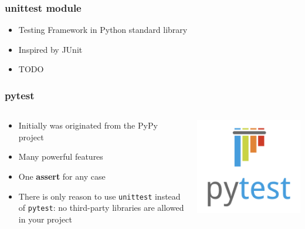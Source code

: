 \documentclass[compress]{beamer}
\begin{document}
\begin{frame}[fragile]
\frametitle{unittest module}

\begin{itemize}
  \item Testing Framework in Python standard library
  \item Inspired by JUnit
  \item TODO
\end{itemize}

\end{frame}


\begin{frame}[fragile]
\frametitle{pytest}

\begin{columns}[T]
\begin{column}{.8\textwidth}
    \begin{itemize}
    \item Initially was originated from the PyPy project
    \item Many powerful features
    \item One \textbf{assert} for any case
    \item There is only reason to use \texttt{unittest} instead of \texttt{pytest}: no third-party libraries are allowed in your project
    \end{itemize}
\end{column}
\begin{column}{.2\textwidth}
    \includegraphics[width=\textwidth]{pytest_logo.png}
\end{column}
\end{columns}
  
\end{frame}
\end{document}
